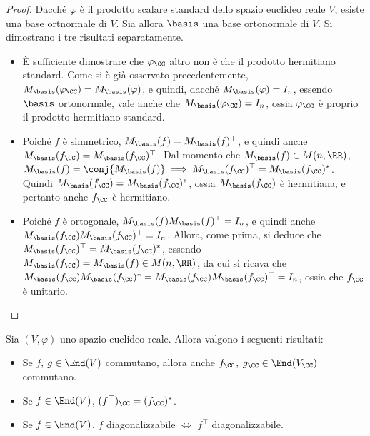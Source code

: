 \begin{proof}
	Dacché $\varphi$ è il prodotto scalare standard dello spazio euclideo reale $V$, esiste una base ortnormale di $V$. Sia allora $\basis$ una base ortonormale di $V$. Si dimostrano i tre risultati separatamente.
	
	\begin{itemize}
		\item È sufficiente dimostrare che $\varphi_\CC$ altro non è che il prodotto hermitiano standard.
		Come si è già osservato precedentemente, $M_\basis(\varphi_\CC) = M_\basis(\varphi)$, e quindi,
		dacché $M_\basis(\varphi) = I_n$, essendo $\basis$ ortonormale, vale anche che $M_\basis(\varphi_\CC) = I_n$,
		ossia $\varphi_\CC$ è proprio il prodotto hermitiano standard.
		
		\item Poiché $f$ è simmetrico, $M_\basis(f) = M_\basis(f)^\top$, e quindi anche
		$M_\basis(f_\CC) = M_\basis(f_\CC)^\top$. Dal momento che $M_\basis(f) \in M(n, \RR)$,
		$M_\basis(f) = \conj{M_\basis(f)} \implies M_\basis(f_\CC)^\top = M_\basis(f_\CC)^*$.
		Quindi $M_\basis(f_\CC) = M_\basis(f_\CC)^*$, ossia $M_\basis(f_\CC)$ è hermitiana,
		e pertanto anche $f_\CC$ è hermitiano.
		
		\item Poiché $f$ è ortogonale, $M_\basis(f) M_\basis(f)^\top = I_n$, e quindi
		anche $M_\basis(f_\CC) M_\basis(f_\CC)^\top = I_n$. Allora, come prima, si deduce
		che $M_\basis(f_\CC)^\top = M_\basis(f_\CC)^*$, essendo $M_\basis(f_\CC) = M_\basis(f) \in M(n, \RR)$,
		da cui
		si ricava che $M_\basis(f_\CC) M_\basis(f_\CC)^* = M_\basis(f_\CC) M_\basis(f_\CC)^\top = I_n$, ossia che $f_\CC$ è unitario. \\ \qedhere
	\end{itemize}
\end{proof}

\begin{exercise}
	Sia $(V, \varphi)$ uno spazio euclideo reale. Allora valgono i seguenti risultati:
	
	\begin{itemize}
		\item Se $f$, $g \in \End(V)$ commutano, allora anche $f_\CC$, $g_\CC \in \End(V_\CC)$ commutano.
		\item Se $f \in \End(V)$, $(f^\top)_\CC = (f_\CC)^*$.
		\item Se $f \in \End(V)$, $f$ diagonalizzabile $\iff$ $f^\top$ diagonalizzabile.
	\end{itemize}
\end{exercise}

